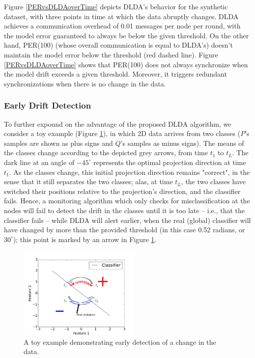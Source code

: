%
Figure \ref{PERvsDLDAoverTime} depicts DLDA's behavior for the synthetic dataset, with 
three points in time at which the data abruptly changes. 
DLDA achieves a communication overhead of 0.01 messages per node per round, with the model 
error guaranteed to always be below the given threshold.
On the other hand,  PER(100) (whose overall communication is equal to DLDA's) doesn't maintain the
model error below the threshold (red dashed line).
Figure \ref{PERvsDLDAoverTime} shows that PER(100) does not always 
synchronize when the model drift exceeds a given threshold. 
Moreover, it triggers redundant synchronizations when there is no change in the data.
%

%

%
\subsubsection{Early Drift Detection}
\label{sec:earlydetection}
%
%
To further expound on the advantage of the proposed DLDA algorithm, we consider 
a toy example (Figure \ref{EarlyDetection}), 
in which 2D data arrives from two classes ($P$'s samples are shown as plus signs 
and $Q$'s samples as minus signs). The means of the classes change 
according to the depicted grey arrows, from time $t_1$ to $t_L$. The dark
line at an angle of $-45^{\circ}$ represents the optimal projection
direction at time $t_1$. As the classes change, this initial projection
direction remains "correct", in the sense that it still separates the
two classes; alas, at time $t_L$, the two classes have switched their
positions relative to the projection's direction, and the classifier
fails. Hence, a monitoring algorithm which only checks for misclassification
at the nodes will fail to detect the drift in the classes until it is too
late -- i.e., that the classifier fails -- while DLDA will alert earlier, 
when the real (global) classifier will have changed by more than the
provided threshold (in this case 0.52 radians, or $30^{\circ}$); this point is marked by an arrow in Figure \ref{EarlyDetection}.
%
%
\begin{figure}
	\centering
	\includegraphics[width=6cm]{graphics/EarlyDetection.png}
	\caption{A toy example demonstrating early detection of a change in the data.
	\label{EarlyDetection}}
\end{figure}
%
%
